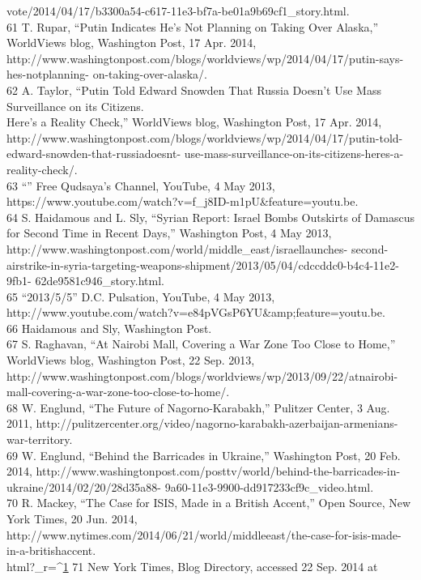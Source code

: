 vote/2014/04/17/b3300a54-c617-11e3-bf7a-be01a9b69cf1_story.html.\\
61 T. Rupar, ``Putin Indicates He’s Not Planning on Taking Over Alaska,'' WorldViews blog, Washington
Post, 17 Apr. 2014, http://www.washingtonpost.com/blogs/worldviews/wp/2014/04/17/putin-says-hes-notplanning-
on-taking-over-alaska/.\\
62 A. Taylor, ``Putin Told Edward Snowden That Russia Doesn’t Use Mass Surveillance on its Citizens.\\
Here’s a Reality Check,'' WorldViews blog, Washington Post, 17 Apr. 2014,
http://www.washingtonpost.com/blogs/worldviews/wp/2014/04/17/putin-told-edward-snowden-that-russiadoesnt-
use-mass-surveillance-on-its-citizens-heres-a-reality-check/.\\
63 ``'' Free Qudsaya’s Channel, YouTube, 4 May
2013, https://www.youtube.com/watch?v=f_j8ID-m1pU&feature=youtu.be.\\
64 S. Haidamous and L. Sly, ``Syrian Report: Israel Bombs Outskirts of Damascus for Second Time in
Recent Days,'' Washington Post, 4 May 2013, http://www.washingtonpost.com/world/middle_east/israellaunches-
second-airstrike-in-syria-targeting-weapons-shipment/2013/05/04/cdccddc0-b4c4-11e2-9fb1-
62de9581c946_story.html.\\
65 ``2013/5/5'' D.C. Pulsation, YouTube, 4 May 2013,
http://www.youtube.com/watch?v=e84pVGsP6YU&amp;feature=youtu.be.\\
66 Haidamous and Sly, Washington Post.\\
67 S. Raghavan, ``At Nairobi Mall, Covering a War Zone Too Close to Home,'' WorldViews blog,
Washington Post, 22 Sep. 2013, http://www.washingtonpost.com/blogs/worldviews/wp/2013/09/22/atnairobi-
mall-covering-a-war-zone-too-close-to-home/.\\
68 W. Englund, ``The Future of Nagorno-Karabakh,'' Pulitzer Center, 3 Aug. 2011,
http://pulitzercenter.org/video/nagorno-karabakh-azerbaijan-armenians-war-territory.\\
69 W. Englund, ``Behind the Barricades in Ukraine,'' Washington Post, 20 Feb. 2014,
http://www.washingtonpost.com/posttv/world/behind-the-barricades-in-ukraine/2014/02/20/28d35a88-
9a60-11e3-9900-dd917233cf9c_video.html.\\
70 R. Mackey, ``The Case for ISIS, Made in a British Accent,'' Open Source, New York Times, 20 Jun. 2014,
http://www.nytimes.com/2014/06/21/world/middleeast/the-case-for-isis-made-in-a-britishaccent.\\
html?_r=^{\href{#endnotes}{1}}
71 New York Times, Blog Directory, accessed 22 Sep. 2014 at
